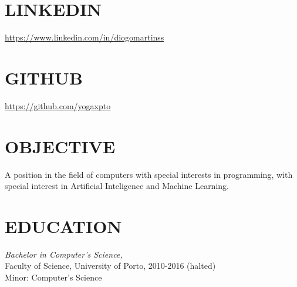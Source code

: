 \documentclass[margin, 10pt]{res} %
\begin{document}
\begin{resume}


    \section{LINKEDIN}

    \href{https://www.linkedin.com/in/diogomartinss}{https://www.linkedin.com/in/diogomartinss}


    \section{GITHUB}

    \href{https://github.com/yogaxpto}{https://github.com/yogaxpto}


    \section{OBJECTIVE}

    A position in the field of computers with special interests in programming, with special interest in Artificial Inteligence and Machine Learning.


    \section{EDUCATION}

     {\sl Bachelor in Computer's Science,} \\
    Faculty of Science, University of Porto, 2010-2016 (halted)  \\
    Minor: Computer's Science



\end{resume}
\end{document}
